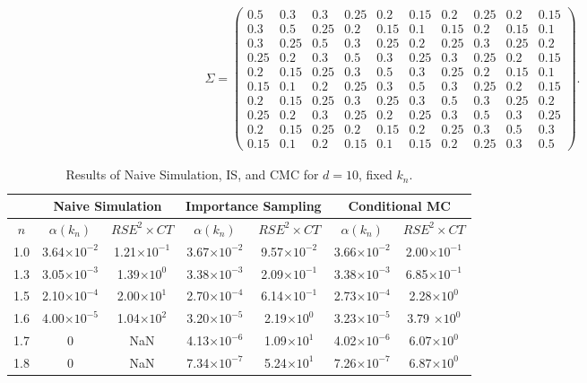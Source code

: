\documentclass[final,11pt,3p]{article}\usepackage{setspace}
\begin{document}
\begin{gather*}
\Sigma=
\begin{pmatrix}
0.5 & 0.3 & 0.3 & 0.25 & 0.2 & 0.15 & 0.2 & 0.25 & 0.2 & 0.15\\
0.3 & 0.5 & 0.25 & 0.2 & 0.15 & 0.1 & 0.15 & 0.2 & 0.15 & 0.1\\
0.3 & 0.25 & 0.5 & 0.3 & 0.25 & 0.2 & 0.25 & 0.3 & 0.25 & 0.2\\
0.25 & 0.2 & 0.3 & 0.5 & 0.3 & 0.25 & 0.3 & 0.25 & 0.2 & 0.15\\
0.2 & 0.15 & 0.25 & 0.3 & 0.5 & 0.3 & 0.25 & 0.2 & 0.15 & 0.1\\
0.15 & 0.1 & 0.2 & 0.25 & 0.3 & 0.5 & 0.3 & 0.25 & 0.2 & 0.15\\
0.2 & 0.15 & 0.25 & 0.3 & 0.25 & 0.3 & 0.5 & 0.3 & 0.25 & 0.2\\
0.25 & 0.2 & 0.3 & 0.25 & 0.2 & 0.25 & 0.3 & 0.5 & 0.3 & 0.25\\
0.2 & 0.15 & 0.25 & 0.2 & 0.15 & 0.2 & 0.25 & 0.3 & 0.5 & 0.3\\
0.15 & 0.1 & 0.2 & 0.15 & 0.1 & 0.15 & 0.2 & 0.25 & 0.3 & 0.5
\end{pmatrix}
.
\end{gather*}

\begin{table}[!htb]
\caption{{Results of Naive Simulation, IS, and CMC for $d = 10$, fixed $k_n$}. }\centering
\vspace{0.5cm}
\begin{tabular}
[c]{c|c|c|c|c|c|c}\hline
& \multicolumn{2}{|c}{Naive Simulation} & \multicolumn{2}{|c}{Importance
Sampling} & \multicolumn{2}{|c}{Conditional MC}\\\hline
$n$ & $\alpha(k_n)$ & $RSE^{2} \times CT$ & $\alpha(k_n)$ & $RSE^{2} \times CT$ &
$\alpha(k_n)$ & $RSE^{2} \times CT$\\\hline
1.0 & 3.64$\times10^{-2}$ & 1.21$\times10^{-1}$ & 3.67$\times10^{-2}$ &
9.57$\times10^{-2}$ & 3.66$\times10^{-2}$ & 2.00$\times10^{-1}$\\\hline
1.3 & 3.05$\times10^{-3}$ & 1.39$\times10^{0}$ & 3.38$\times10^{-3}$ &
2.09$\times10^{-1}$ & 3.38$\times10^{-3}$ & 6.85$\times10^{-1}$\\\hline
1.5 & 2.10$\times10^{-4}$ & 2.00$\times10^{1}$ & 2.70$\times10^{-4}$ &
6.14$\times10^{-1}$ & 2.73$\times10^{-4}$ & 2.28$\times10^{0}$\\\hline
1.6 & 4.00$\times10^{-5}$ & 1.04$\times10^{2}$ & 3.20$\times10^{-5}$ &
2.19$\times10^{0}$ & 3.23$\times10^{-5}$ & 3.79 $\times10^{0}$\\\hline
1.7 & 0 & NaN & 4.13$\times10^{-6}$ & 1.09$\times10^{1}$ & 4.02$\times10^{-6}$
& 6.07$\times10^{0}$\\\hline
1.8 & 0 & NaN & 7.34$\times10^{-7}$ & 5.24$\times10^{1}$ & 7.26$\times
10^{-7}$ & 6.87$\times10^{0}$\\\hline
\end{tabular}
\end{table}
\end{document}
